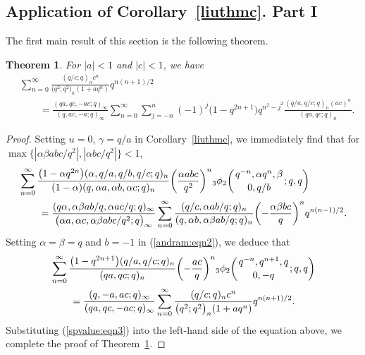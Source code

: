 \documentclass[pdftex]{sigma}
\numberwithin{equation}{section}
\newtheorem{Theorem}{Theorem}[section]
\begin{document}
\subsection{Application of Corollary~\ref{liuthmc}. Part I}
The first main result of this section is the following theorem.
\begin{Theorem}\label{andrrthm1} For $|a|<1$ and $|c|<1$, we have
	\begin{align*} %
		&\sum_{n=0}^\infty \frac{(q/c; q)_n c^n}{\bigl(q^2; q^2\bigr)_n (1+aq^n)} q^{n(n+1)/2}\\
		&\qquad{}=\frac{(qa, qc, -ac; q)_\infty}{(q, ac, -a; q)_{\infty}}
		\sum_{n=0}^\infty \sum_{j=-n}^n (-1)^j \bigl(1-q^{2n+1}\bigr) q^{n^2-j^2}
		\frac{(q/a, q/c; q)_n (ac)^n}{(qa, qc; q)_n}. \nonumber
	\end{align*}	
\end{Theorem}
\begin{proof}
Setting $u=0$, $\gamma=q/a$ in Corollary~\ref{liuthmc}, we immediately find that for $\max\{|\alpha \beta abc/q^2|,\allowbreak |\alpha bc/q^2|\}<1$,
\begin{align}
	&\sum_{n=0}^\infty \frac{\bigl(1-\alpha q^{2n}\bigr)(\alpha, q/a, q/b, q/c; q)_n}{(1-\alpha)(q, \alpha a, \alpha b, \alpha c; q)_n}\biggl(\frac{\alpha abc}{q^2}\biggr)^n
	{_3\phi_2}\biggl({{q^{-n}, \alpha q^n, \beta}
		\atop{0, q/b}}; q, q\biggr)\nonumber\\
	&\qquad{}=\frac{(q\alpha, \alpha \beta ab/q, \alpha ac/q; q )_\infty}{\bigl(\alpha a,\alpha c, \alpha \beta abc/q^2; q \bigr)_\infty}
	\sum_{n=0}^\infty \frac{(q/c, \alpha ab/q; q)_n}{(q, \alpha b, \alpha \beta ab/q; q)_n}\biggl(-\frac{\alpha \beta bc}{q}\biggr)^n q^{n(n-1)/2}.\label{andram:eqn2}
\end{align}
Setting $\alpha=\beta=q$ and $b=-1$ in (\ref{andram:eqn2}), we deduce that
	\begin{align*}
		&\sum_{n=0}^\infty \frac{\bigl(1-q^{2n+1}\bigr)(q/a, q/c; q)_n}{(qa, q c; q)_n}\biggl(-\frac{ac}{q}\biggr)^n
		{_3\phi_2}\biggl({{q^{-n}, q^{n+1}, q}
			\atop{0, -q}}; q, q\biggr)\\
		&\qquad{}=\frac{(q, -a, ac; q )_\infty}{(qa, qc, -ac; q )_\infty}
		\sum_{n=0}^\infty \frac{(q/c; q)_n c^n}{\bigl(q^2; q^2\bigr)_n (1+aq^n)} q^{n(n+1)/2}.\nonumber
	\end{align*}	
	Substituting (\ref{spvalue:eqn3}) into the left-hand side of the equation above, we complete the proof of Theorem~\ref{andrrthm1}.
\end{proof}
\end{document}
